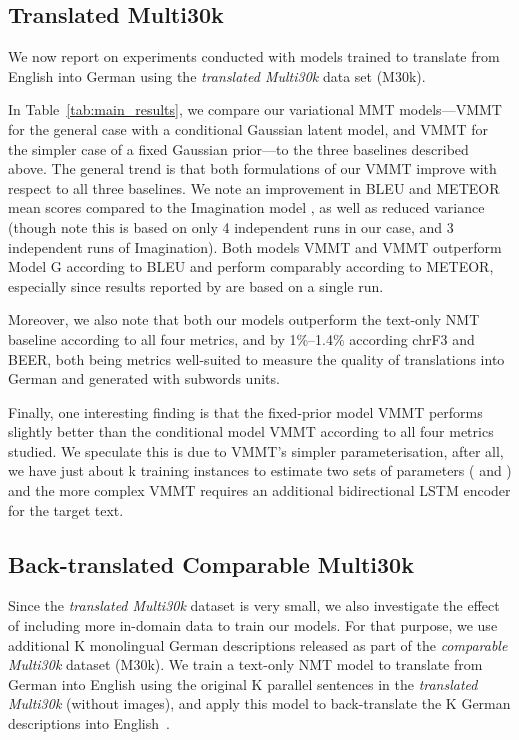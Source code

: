 \documentclass[11pt,a4paper]{article}
\newcommand{\cond}{VMMT\xspace}
\newcommand{\uncond}{VMMT\xspace}
\begin{document}
\subsection{Translated Multi30k}
\label{sec:translated}

We now report on experiments conducted with models trained to translate from English into German using the \emph{translated Multi30k} data set (M30k).

In Table~\ref{tab:main_results}, we compare our variational MMT models---\cond for the general case with a conditional Gaussian latent model, and \uncond for the simpler case of a fixed Gaussian prior---to the three baselines described above.
The general trend is that both formulations of our VMMT improve with respect to all three baselines.
We note an improvement in BLEU and METEOR mean scores compared to the Imagination model \citep{ElliottKadar2017}, as well as reduced variance (though note this is based on only 4 independent runs in our case, and 3 independent runs of Imagination).
Both models \uncond and \cond outperform Model G according to BLEU and perform comparably according to METEOR, especially since results reported by \citep{Toyamaetal2016} are based on a single run.

Moreover, we also note that both our models outperform the text-only NMT baseline according to all four metrics, and by 1\%--1.4\% according chrF3 and BEER, both being metrics well-suited to measure the quality of translations into German and generated with subwords units.

Finally, one interesting finding is that the fixed-prior model \uncond performs slightly better than the conditional model \cond according to all four metrics studied.
We speculate this is due to \uncond's simpler parameterisation, after all, we have just about k training instances to estimate two sets of parameters ( and ) and the more complex \cond requires an additional bidirectional LSTM encoder for the target text.




\subsection{Back-translated Comparable Multi30k}\label{sec:backtranslated}

Since the \emph{translated Multi30k} dataset is very small, we also investigate the effect of including more in-domain data to train our models.
For that purpose, we use additional K monolingual German descriptions released as part of the \emph{comparable Multi30k} dataset (M30k). We train a text-only NMT model to translate from German into English using the original K parallel sentences in the \emph{translated Multi30k} (without images), and apply this model to back-translate the K German descriptions into English~\citep{Sennrichetal:2016:Backtranslation}.
\end{document}
